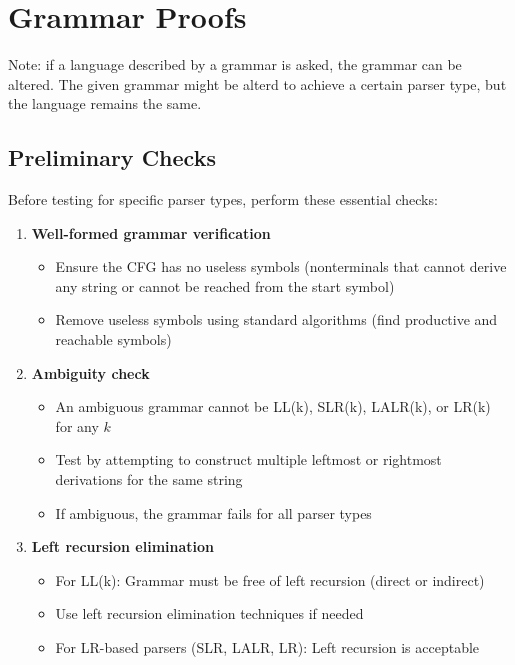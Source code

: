
\section{Grammar Proofs}

Note: if a language described by a grammar is asked, the grammar can be altered. The given grammar might be alterd to achieve a certain parser type, but the language remains the same.

\subsection{Preliminary Checks}

Before testing for specific parser types, perform these essential checks:

\begin{enumerate}
    \item \textbf{Well-formed grammar verification}
    \begin{itemize}
        \item Ensure the CFG has no useless symbols (nonterminals that cannot derive any string or cannot be reached from the start symbol)
        \item Remove useless symbols using standard algorithms (find productive and reachable symbols)
    \end{itemize}
    
    \item \textbf{Ambiguity check}
    \begin{itemize}
        \item An ambiguous grammar cannot be LL(k), SLR(k), LALR(k), or LR(k) for any $k$
        \item Test by attempting to construct multiple leftmost or rightmost derivations for the same string
        \item If ambiguous, the grammar fails for all parser types
    \end{itemize}
    
    \item \textbf{Left recursion elimination}
    \begin{itemize}
        \item For LL(k): Grammar must be free of left recursion (direct or indirect)
        \item Use left recursion elimination techniques if needed
        \item For LR-based parsers (SLR, LALR, LR): Left recursion is acceptable
    \end{itemize}
\end{enumerate}

